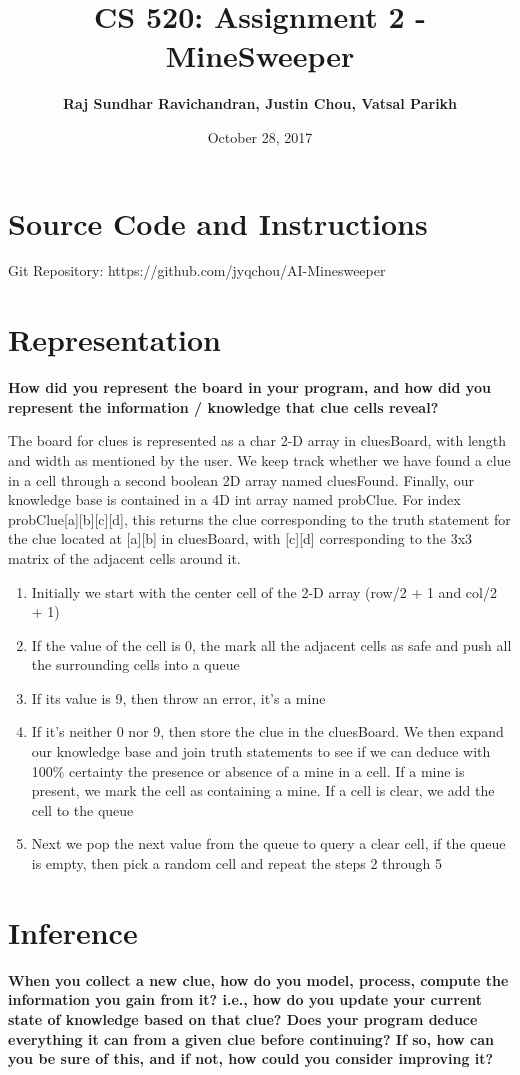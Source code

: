 \documentclass[a4paper]{article}
\title{\textbf{CS 520: Assignment 2 - MineSweeper}}
\author{\textbf{Raj Sundhar Ravichandran, Justin Chou, Vatsal Parikh}}
\date{October 28, 2017}
\begin{document}
\maketitle
\section{Source Code and Instructions}
Git Repository: https://github.com/jyqchou/AI-Minesweeper\\
\section{Representation}
\textbf{How did you represent the board in your program, and how did you represent the information
/ knowledge that clue cells reveal?}

The board for clues is represented as a char 2-D array in cluesBoard, with length and width as mentioned by the user. We keep track whether we have found a clue in a cell through a second boolean 2D array named cluesFound. Finally, our knowledge base is contained in a 4D int array named probClue. For index probClue[a][b][c][d], this returns the clue corresponding to the truth statement for the clue located at [a][b] in cluesBoard, with [c][d] corresponding to the 3x3 matrix of the adjacent cells around it.

\begin{enumerate}
\item Initially we start with the center cell of the 2-D array (row/2 + 1 and col/2 + 1)
\item If the value of the cell is 0, the mark all the adjacent cells as safe and push all the surrounding cells into a queue
\item If its value is 9, then throw an error, it's a mine
\item If it's neither 0 nor 9, then store the clue in the cluesBoard. We then expand our knowledge base and join truth statements to see if we can deduce with 100\% certainty the presence or absence of a mine in a cell. If a mine is present, we mark the cell as containing a mine. If a cell is clear, we add the cell to the queue
\item Next we pop the next value from the queue to query a clear cell, if the queue is empty, then pick a random cell and repeat the steps 2 through 5
\end{enumerate}

\section{Inference}
\textbf{When you collect a new clue, how do you model, process, compute the information you gain from
it? i.e., how do you update your current state of knowledge based on that clue? Does your program deduce
everything it can from a given clue before continuing? If so, how can you be sure of this, and if not, how could
you consider improving it?}
\end{document}

